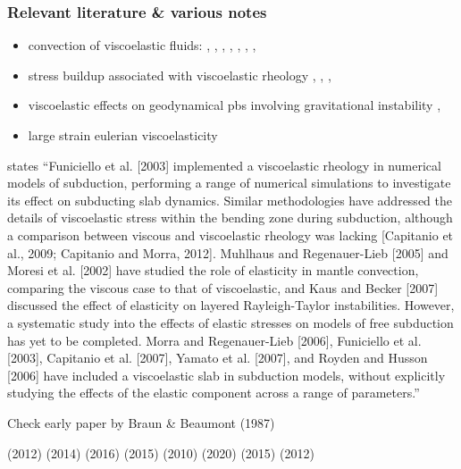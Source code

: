 \subsubsection{Relevant literature \& various notes}



\begin{itemize}
\item convection of viscoelastic fluids: 
\textcite{hard91}, \textcite{momy93}, 
\textcite{zhgm96}, \textcite{modm02}, 
\textcite{mure05}, \textcite{likh05a},  
\textcite{likh05b}, \textcite{fukk08}


\item stress buildup associated with viscoelastic rheology 
\textcite{kubo77}, \textcite{kupa84}, \textcite{pocp93}, \textcite{mapo09}

\item viscoelastic effects on geodynamical pbs involving gravitational instability 
\textcite{pocp93,kabe07,bumo08,scbe08}, 
\textcite{hamy95} 

\item large strain  eulerian viscoelasticity 
\textcite{scps01,vapy01,coll06,moql07,fukk08,poso08}

\end{itemize}

\textcite{famc14} states 
``Funiciello et al. [2003] implemented a viscoelastic rheology in numerical models of subduction, performing a
range of numerical simulations to investigate its effect on subducting slab dynamics. Similar methodologies have addressed the details of viscoelastic stress within the bending zone during subduction, although a comparison between viscous and viscoelastic rheology was lacking [Capitanio et al., 2009; Capitanio and Morra, 2012].
Muhlhaus and Regenauer-Lieb [2005] and Moresi et al. [2002] have studied the role of elasticity in mantle convection, comparing the viscous case to that of viscoelastic, and Kaus and Becker [2007] discussed the effect of elasticity on layered Rayleigh-Taylor instabilities. However, a systematic study into the effects of elastic stresses on models of free subduction has yet to be completed. Morra and Regenauer-Lieb [2006], Funiciello et al. [2003], Capitanio et al. [2007], Yamato et al. [2007], and Royden and Husson [2006] have included a viscoelastic slab in subduction models, without explicitly studying the effects of the elastic component across a range of parameters.''


Check early paper by Braun \& Beaumont (1987) \cite{brbe87}

\textcite{asmo12} (2012)
\textcite{hepk14} (2014)
\textcite{daws16} (2016)
\textcite{thkp15} (2015)
\textcite{beps10} (2010)
\textcite{samb20} (2020)
\textcite{vosc15} (2015)
\textcite{nalr12} (2012)
